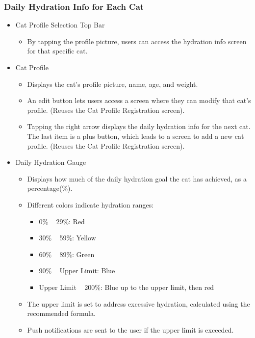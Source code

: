\documentclass[conference]{IEEEtran}
\begin{document}
\subsubsection{Daily Hydration Info for Each Cat}
\begin{itemize}
    \item Cat Profile Selection Top Bar
    \begin{itemize}
        \item By tapping the profile picture, users can access the hydration info screen for that specific cat.
    \end{itemize}
    \item Cat Profile
    \begin{itemize}
        \item Displays the cat's profile picture, name, age, and weight.
        \item An edit button lets users access a screen where they can modify that cat's profile. (Reuses the Cat Profile Registration screen).
        \item Tapping the right arrow displays the daily hydration info for the next cat. The last item is a plus button, which leads to a screen to add a new cat profile. (Reuses the Cat Profile Registration screen).
    \end{itemize}
    \item Daily Hydration Gauge
    \begin{itemize}
        \item Displays how much of the daily hydration goal the cat has achieved, as a percentage(\%).
        \item Different colors indicate hydration ranges:
        \begin{itemize}
            \item 0\% ~ 29\%: Red
            \item 30\% ~ 59\%: Yellow
            \item 60\% ~ 89\%: Green
            \item 90\% ~ Upper Limit: Blue
            \item Upper Limit ~ 200\%: Blue up to the upper limit, then red
        \end{itemize}
        \item The upper limit is set to address excessive hydration, calculated using the recommended formula.
        \item Push notifications are sent to the user if the upper limit is exceeded.
    \end{itemize}

\end{itemize}
\end{document}
